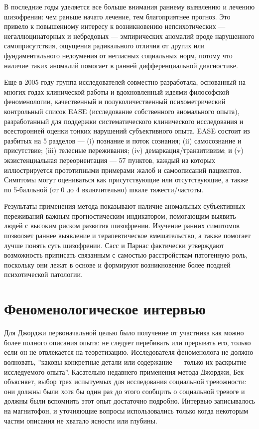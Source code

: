\documentclass[11pt]{book}
\begin{document}
\begin{enumerate}
В последние годы уделяется все больше внимания раннему выявлению и лечению шизофрении: чем раньше начато лечение, тем благоприятнее прогноз. Это привело к повышенному интересу к возникновению непсихотических --- негаллюцинаторных и небредовых --- эмпирических аномалий вроде нарушенного самоприсутствия, ощущения радикального отличия от других или фундаментального недоумения от негласных социальных норм, потому что наличие таких аномалий помогает в ранней дифференциальной диагностике.

Еще в 2005 году группа исследователей совместно разработала, основанный на многих годах клинической работы и вдохновленный идеями философской феноменологии, качественный и полуколичественный психометрический контрольный список EASE (исследование собственного аномального опыта), разработанный для поддержки систематического клинического исследования и всесторонней оценки тонких нарушений субъективного опыта. EASE состоит из разбитых на 5 разделов --- (i) познание и поток сознания; (ii) самосознание и присутствие; (iii) телесные переживания; (iv) демаркация/транзитивизм; и (v) экзистенциальная переориентация --- 57 пунктов, каждый из которых иллюстрируется прототипными примерами жалоб и самоописаний пациентов. Симптомы могут оцениваться как присутствующие или отсутствующие, а также по 5-балльной (от 0 до 4 включительно) шкале тяжести/частоты.

Результаты применения метода показывают наличие аномальных субъективных переживаний важным прогностическим индикатором, помогающим выявить людей с высоким риском развития шизофрении. Изучение ранних симптомов позволяет раннее выявление и терапевтическое вмешательство, а также помогает лучше понять суть шизофрении. Сасс и Парнас фактически утверждают возможность приписать связанным с самостью расстройствам патогенную роль, поскольку они лежат в основе и формируют возникновение более поздней психотической патологии.

\end{enumerate}

\section{Феноменологическое интервью}

Для Джорджи первоначальной целью было получение от участника как можно более полного описания опыта: не следует перебивать или прерывать его, только если он не отвлекается на теоретизацию. Исследователя-феноменолога не должно волновать, ''каковы конкретные детали или содержание --- только их раскрытие исследуемого опыта''. Касательно недавнего применения метода Джорджи, Бек объясняет, выбор трех испытуемых для исследования социальной тревожности: они должны были хотя бы один раз до этого сообщить о социальной тревоге и должны были вспомнить этот опыт достаточно подробно. Интервью записывалось на магнитофон, и уточняющие вопросы использовались только когда некоторым частям описания не хватало ясности или глубины.
\end{document}
